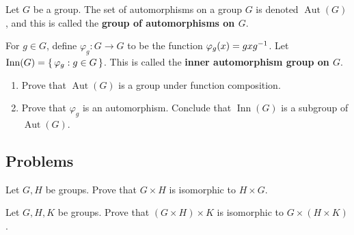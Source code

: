 \documentclass[./main.tex]{subfiles}
\begin{document}
\begin{exercise}
    Let $G$ be a group. The set of automorphisms on a group $G$ is denoted
    $\operatorname{Aut}(G)$, and this is called the \textbf{group of automorphisms on $G$}. 

    For $g \in G$, define $\varphi_g: G \to G$ to be the function $\varphi_g(x) = gxg^{-1}$. 
    Let $\operatorname{Inn}(G) = \set{\varphi_g: g \in G}$. This is called the \textbf{inner automorphism group on $G$}.

    \begin{enumerate}
        \item Prove that $\operatorname{Aut}(G)$ is a group under function
        composition.
        \item Prove that $\varphi_g$ is an automorphism. Conclude that
        $\operatorname{Inn}(G)$ is a subgroup of $\operatorname{Aut}(G)$.
    \end{enumerate}
\end{exercise}

\subsection{Problems}

\begin{exercise}
    Let $G, H$ be groups. Prove that $G \times H$ is isomorphic to $H \times G$.
\end{exercise}

\begin{exercise}
    Let $G, H, K$ be groups. Prove that $(G \times H) \times K$ is isomorphic to
    $G \times (H \times K)$.
\end{exercise}
\end{document}
